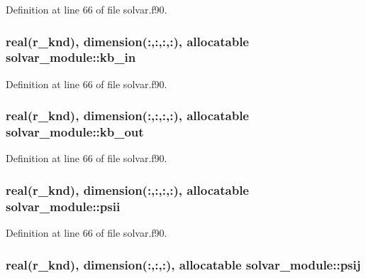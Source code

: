Definition at line 66 of file solvar.\-f90.

\hypertarget{classsolvar__module_a7e928ad260554afcde0e80147b5176dd}{
\subsubsection[{kb\-\_\-in}]{\setlength{\rightskip}{0pt plus 5cm}real(r\-\_\-knd), dimension(\-:,\-:,\-:,\-:), allocatable solvar\-\_\-module\-::kb\-\_\-in}}\label{classsolvar__module_a7e928ad260554afcde0e80147b5176dd}


Definition at line 66 of file solvar.\-f90.

\hypertarget{classsolvar__module_a500e3ed7d4b1812584b2561e844a1a91}{
\subsubsection[{kb\-\_\-out}]{\setlength{\rightskip}{0pt plus 5cm}real(r\-\_\-knd), dimension(\-:,\-:,\-:,\-:), allocatable solvar\-\_\-module\-::kb\-\_\-out}}\label{classsolvar__module_a500e3ed7d4b1812584b2561e844a1a91}


Definition at line 66 of file solvar.\-f90.

\hypertarget{classsolvar__module_a70ce9ad936b5c35e2638616537a783be}{
\subsubsection[{psii}]{\setlength{\rightskip}{0pt plus 5cm}real(r\-\_\-knd), dimension(\-:,\-:,\-:,\-:), allocatable solvar\-\_\-module\-::psii}}\label{classsolvar__module_a70ce9ad936b5c35e2638616537a783be}


Definition at line 66 of file solvar.\-f90.

\hypertarget{classsolvar__module_a538acac9dd6036215210811a55c04ee8}{
\subsubsection[{psij}]{\setlength{\rightskip}{0pt plus 5cm}real(r\-\_\-knd), dimension(\-:,\-:,\-:), allocatable solvar\-\_\-module\-::psij}}\label{classsolvar__module_a538acac9dd6036215210811a55c04ee8}


